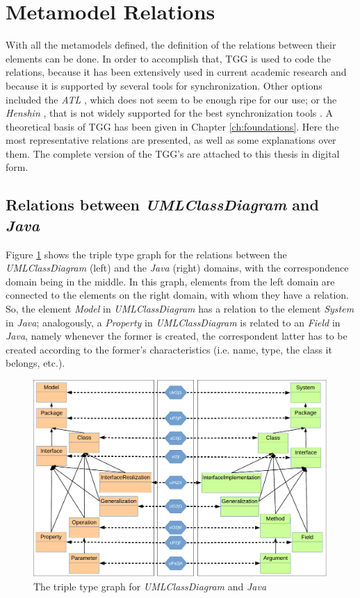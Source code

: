 \documentclass[tuberlin,cic,tc,english,noabntcite]{iiufrgs}
\begin{document}
\section{Metamodel Relations}
\label{subsec:MetamodelRelations}
With all the metamodels defined, the definition of the relations between their elements can be done. In order to accomplish that, TGG is used to code the relations, because it has been extensively used in current academic research and because it is supported by several tools for synchronization. Other options included the \emph{ATL} \citep{jouault2008atl}, which does not seem to be enough ripe for our use; or the \emph{Henshin} \citep{arendt2010henshin}, that is not widely supported for the best synchronization tools \citep{hildebrandt2013survey}. A theoretical basis of TGG has been given in Chapter \ref{ch:foundations}. Here the most representative relations are presented, as well as some explanations over them. The complete version of the TGG's are attached to this thesis in digital form.

\subsection{Relations between \emph{UMLClassDiagram} and \emph{Java}}
\label{subsec:umlClassDiagram2Java}
Figure \ref{fig:umlClassDiagram2java_type} shows the triple type graph for the relations between the \emph{UMLClassDiagram} (left) and the \emph{Java} (right) domains, with the correspondence domain being in the middle. In this graph, elements from the left domain are connected to the elements on the right domain, with whom they have a relation. So, the element \emph{Model} in \emph{UMLClassDiagram} has a relation to the element \emph{System} in \emph{Java}; analogously, a \emph{Property} in \emph{UMLClassDiagram} is related to an \emph{Field} in \emph{Java}, namely whenever the former is created, the correspondent latter has to be created according to the former's characteristics (i.e. name, type, the class it belongs, etc.).

\begin{figure}[H]
    \caption{The triple type graph for \emph{UMLClassDiagram} and \emph{Java}}
    \begin{center}
        \includegraphics[width=.7\textwidth]{umlClassDiagram2java_type}
    \end{center}
    \label{fig:umlClassDiagram2java_type}
\end{figure}
\end{document}

